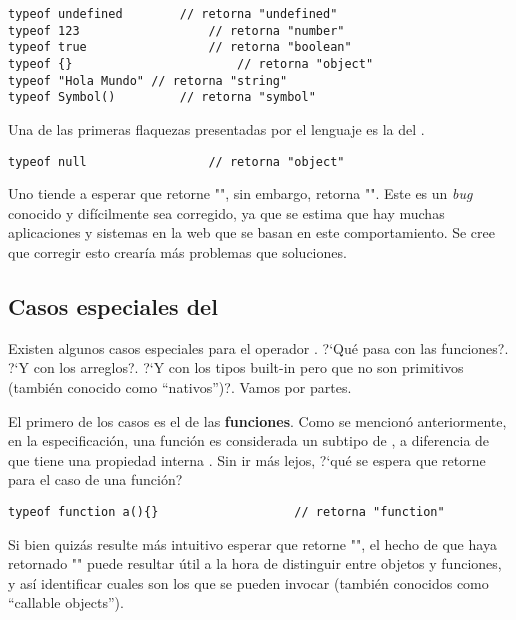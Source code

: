 \begin{lstlisting}[title={Analizando los tipos con \code{typeof}}]
typeof undefined		// retorna "undefined"
typeof 123					// retorna "number"
typeof true					// retorna "boolean"
typeof {}						// retorna "object"
typeof "Hola Mundo" // retorna "string"
typeof Symbol()			// retorna "symbol"
\end{lstlisting}

Una de las primeras flaquezas presentadas por el lenguaje es la del . 

\begin{lstlisting}[title={Analizando \code{typeof null}}]
typeof null					// retorna "object"
\end{lstlisting}

Uno tiende a esperar que  retorne "", sin embargo, retorna "". Este es un \textit{bug} conocido y difícilmente sea corregido, ya que se estima que hay muchas aplicaciones y sistemas en la web que se basan en este comportamiento. Se cree que corregir esto crearía más problemas que soluciones.

\subsection{Casos especiales del }

Existen algunos casos especiales para el operador . ?`Qué pasa con las funciones?. ?`Y con los arreglos?. ?`Y con los tipos built-in pero que no son primitivos (también conocido como "`nativos"')?. Vamos por partes.

El primero de los casos es el de las \textbf{funciones}. Como se mencionó anteriormente, en la especificación, una función es considerada un subtipo de , a diferencia de que tiene una propiedad interna \code{[[Call]]}. Sin ir más lejos, ?`qué se espera que retorne  para el caso de una función?

\begin{lstlisting}[title={Analizando \code{typeof} de una función}]
typeof function a(){}					// retorna "function"
\end{lstlisting}

Si bien quizás resulte más intuitivo esperar que retorne "", el hecho de que haya retornado "" puede resultar útil a la hora de distinguir entre objetos y funciones, y así identificar cuales son los que se pueden invocar (también conocidos como "`callable objects"').

